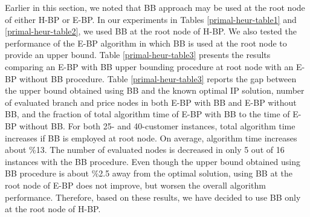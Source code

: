 Earlier in this section, we noted that BB approach may be used at the root node
of either H-BP or E-BP. In our experiments in Tables \ref{primal-heur-table1}
and \ref{primal-heur-table2}, we used BB at the root node of H-BP.
We also tested the performance of the E-BP algorithm in which BB is used
at the root node to provide an upper bound. Table \ref{primal-heur-table3}
presents the results comparing an E-BP with BB upper bounding procedure at root
node with an E-BP without BB procedure. Table \ref{primal-heur-table3}
reports the gap between the upper bound obtained using BB and the
known optimal IP solution, number of evaluated branch and price nodes
in both E-BP with BB and E-BP without BB, and the fraction of total
algorithm time of E-BP with BB to the time of E-BP without BB.
For both 25- and 40-customer instances, total algorithm time increases
if BB is employed at root node. On average, algorithm time increases
about \%13.  The number of evaluated nodes is decreased
in only 5 out of 16 instances with the BB procedure. Even though
the upper bound obtained using BB procedure is about \%2.5 away
from the optimal solution, using BB at the root node of E-BP does not
improve, but worsen the overall algorithm performance.
Therefore, based on these results, we have decided to use BB only at the
root node of H-BP.

